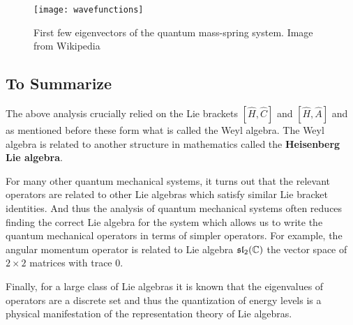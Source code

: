 \begin{figure}[H]
		\centering
		\texttt{[image: wavefunctions]}
		\caption{First few eigenvectors of the quantum mass-spring system. Image from Wikipedia}
	\end{figure}


\subsection{To Summarize}
The above analysis crucially relied on the Lie brackets $[\hat{H},\hat{C}]$ and  $[\hat{H},\hat{A}]$ and as mentioned before these form what is called the Weyl algebra.
The Weyl algebra is related to another structure in mathematics called the \textbf{Heisenberg Lie algebra}.

 For many other quantum mechanical systems, it turns out that the relevant operators are related to other Lie algebras which satisfy similar Lie bracket identities. And thus the analysis of quantum mechanical systems often reduces finding the correct Lie algebra for the system which allows us to write the quantum mechanical operators in terms of simpler operators. For example, the angular momentum operator is related to Lie algebra $\frak{sl}_2(\mathbb{C})$ the vector space of $2 \times 2$ matrices with trace 0.

Finally, for a large class of Lie algebras it is known that the eigenvalues of operators are a discrete set and thus the quantization of energy levels is a physical manifestation of the representation theory of Lie algebras.


